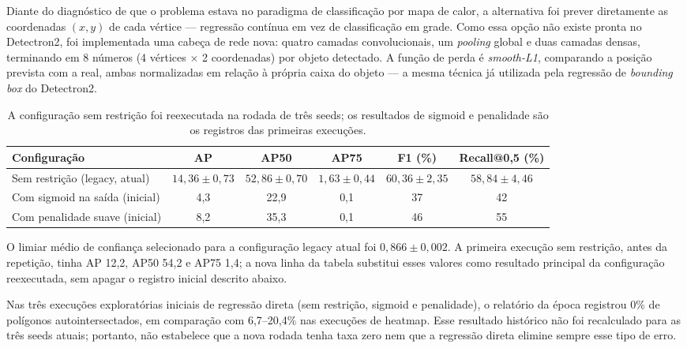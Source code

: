 \documentclass[11pt]{article}
\begin{document}
Diante do diagnóstico de que o problema estava no paradigma de classificação por
mapa de calor, a alternativa foi prever diretamente as coordenadas $(x, y)$ de cada
vértice --- regressão contínua em vez de classificação em grade. Como essa opção
não existe pronta no Detectron2, foi implementada uma cabeça de rede nova: quatro
camadas convolucionais, um \textit{pooling} global e duas camadas densas,
terminando em 8 números (4 vértices $\times$ 2 coordenadas) por objeto detectado. A
função de perda é \textit{smooth-L1}, comparando a posição prevista com a real,
ambas normalizadas em relação à própria caixa do objeto --- a mesma técnica já
utilizada pela regressão de \textit{bounding box} do Detectron2.

\begin{table}[H]
\centering
\caption{A configuração sem restrição foi reexecutada na rodada de três seeds; os
resultados de sigmoid e penalidade são os registros das primeiras execuções.}
\begin{tabular}{lccccc}
\toprule
Configuração & AP & AP50 & AP75 & F1 (\%) & Recall@0,5 (\%) \\
\midrule
Sem restrição (legacy, atual) & $14,36\pm0,73$ & $52,86\pm0,70$ & $1,63\pm0,44$ & $60,36\pm2,35$ & $58,84\pm4,46$ \\
Com sigmoid na saída (inicial) & 4,3 & 22,9 & 0,1 & 37 & 42 \\
Com penalidade suave (inicial) & 8,2 & 35,3 & 0,1 & 46 & 55 \\
\bottomrule
\end{tabular}
\end{table}

O limiar médio de confiança selecionado para a configuração legacy atual foi
$0,866\pm0,002$. A primeira execução sem restrição, antes da repetição, tinha AP
12,2, AP50 54,2 e AP75 1,4; a nova linha da tabela substitui esses valores como
resultado principal da configuração reexecutada, sem apagar o registro inicial
descrito abaixo.

Nas três execuções exploratórias iniciais de regressão direta (sem restrição,
sigmoid e penalidade), o relatório da época registrou 0\% de polígonos
autointersectados, em comparação com 6,7--20,4\% nas execuções de heatmap. Esse
resultado histórico não foi recalculado para as três seeds atuais; portanto, não
estabelece que a nova rodada tenha taxa zero nem que a regressão direta elimine
sempre esse tipo de erro.
\end{document}
